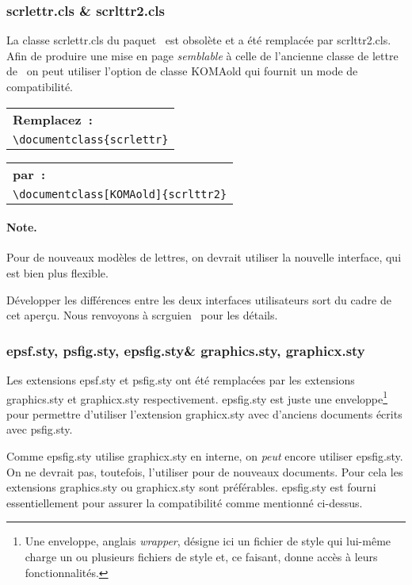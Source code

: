 \documentclass[fontsize=11pt, paper=a4, pagesize, captions=tableheading, numbers=enddot, toc=graduated, footnotes=multiple]{scrartcl}%
\makeatletter
\newcommand{\Doku}[1]{\textsf{#1}\xspace}
\newcommand{\Paket}[1]{\textsf{#1.sty}\xspace}
\newcommand{\Klasse}[1]{\textsf{#1.cls}\xspace}
\newcommand{\Option}[1]{\textsf{#1}\xspace}
\newenvironment{Ers}[1][\linewidth]{%
  \par\bigskip\noindent\marginline{\textcolor{gruen}{\boldmath $\triangleright$}}\begin{tabular}[t]{@{}p{0.5\textwidth}@{}}\textcolor{rot}{\textbf{\textsf{Remplacez~:}}%
}\\[2pt] \rahmenpr[#1]}%
{\endrahmenpr\end{tabular}}
\newenvironment{Dur}[1][0.5\textwidth]{%
\noindent\begin{tabular}[t]{@{}p{0.5\textwidth - 0.5em}@{}}\textcolor{gruen}{\textbf{\textsf{par~:}}}\\[2pt]\rahmenpg[#1]}%
{\endrahmenpg\end{tabular}\smallskip\noindent}
\makeatother
\begin{document}
\subsubsection{\Klasse{scrlettr} \& \Klasse{scrlttr2}}
\label{sec:paketscrl-vs.-pakets}

La classe \Klasse{scrlettr} du paquet \KOMAScript\ est obsolète et a été remplacée par \Klasse{scrlttr2}. Afin de produire une mise en page \emph{semblable} à celle de l'ancienne classe de lettre de \KOMAScript\, on peut utiliser l'option de classe \Option{KOMAold} qui fournit un mode de compatibilité.
\begin{Ers}
  \verb+\documentclass{scrlettr}+
\end{Ers}
\begin{Dur}
  \verb+\documentclass[KOMAold]{scrlttr2}+
\end{Dur}

\paragraph{Note.}
\label{sec:anmerkung-3}

Pour de nouveaux modèles de lettres, on devrait utiliser la nouvelle interface, qui est bien plus flexible.

Développer les différences entre les deux interfaces utilisateurs sort du cadre de cet aperçu. Nous renvoyons à \Doku{scrguien}~\cite{kohm-12} pour les détails.

\subsubsection{\Paket{epsf}, \Paket{psfig}, \Paket{epsfig}\& \Paket{graphics}, \Paket{graphicx}}
\label{sec:grafikeinbindung}

Les extensions \Paket{epsf} et \Paket{psfig} ont été remplacées par les extensions \Paket{graphics} et \Paket{graphicx} respectivement. \Paket{epsfig}est juste une enveloppe\footnote{Une enveloppe, anglais \emph{wrapper}, désigne ici un fichier de style qui lui-même charge un ou plusieurs fichiers de style et, ce faisant, donne accès à leurs fonctionnalités.} pour permettre d’utiliser l'extension \Paket{graphicx} avec d'anciens documents écrits avec \Paket{psfig}.

Comme \Paket{epsfig} utilise \Paket{graphicx} en interne, on \emph{peut} encore utiliser \Paket{epsfig}. On ne devrait pas, toutefois, l'utiliser pour de nouveaux documents. Pour cela les extensions \Paket{graphics} ou \Paket{graphicx} sont préférables. \Paket{epsfig} est fourni essentiellement pour assurer la compatibilité comme mentionné ci-dessus.
\end{document}
